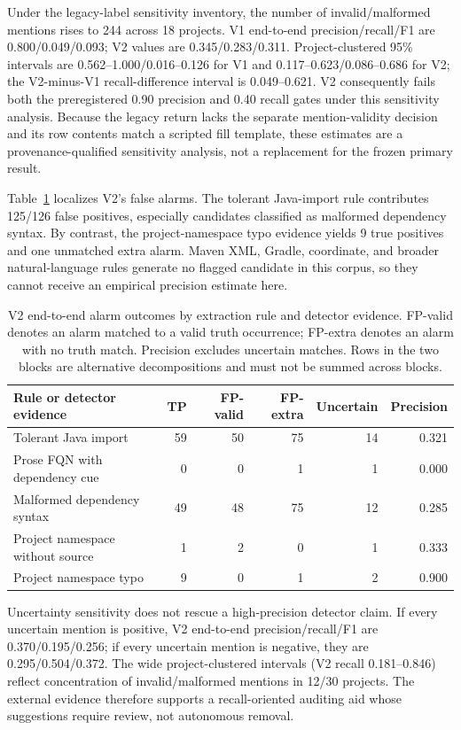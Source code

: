 \documentclass[pdflatex,sn-basic]{sn-jnl}
\begin{document}
Under the legacy-label sensitivity inventory, the number of invalid/malformed mentions rises to 244 across 18 projects. V1 end-to-end precision/recall/F1 are 0.800/0.049/0.093; V2 values are 0.345/0.283/0.311. Project-clustered 95\% intervals are 0.562--1.000/0.016--0.126 for V1 and 0.117--0.623/0.086--0.686 for V2; the V2-minus-V1 recall-difference interval is 0.049--0.621. V2 consequently fails both the preregistered 0.90 precision and 0.40 recall gates under this sensitivity analysis. Because the legacy return lacks the separate mention-validity decision and its row contents match a scripted fill template, these estimates are a provenance-qualified sensitivity analysis, not a replacement for the frozen primary result.

Table~\ref{tab:external-v2-errors} localizes V2's false alarms. The tolerant Java-import rule contributes 125/126 false positives, especially candidates classified as malformed dependency syntax. By contrast, the project-namespace typo evidence yields 9 true positives and one unmatched extra alarm. Maven XML, Gradle, coordinate, and broader natural-language rules generate no flagged candidate in this corpus, so they cannot receive an empirical precision estimate here.

\begin{table}[htbp]
\caption{V2 end-to-end alarm outcomes by extraction rule and detector evidence. FP-valid denotes an alarm matched to a valid truth occurrence; FP-extra denotes an alarm with no truth match. Precision excludes uncertain matches. Rows in the two blocks are alternative decompositions and must not be summed across blocks.}
\label{tab:external-v2-errors}
{\footnotesize
\setlength{\tabcolsep}{3pt}
\begin{tabular}{@{}lrrrrr@{}}
\toprule
Rule or detector evidence & TP & FP-valid & FP-extra & Uncertain & Precision \\
\midrule
Tolerant Java import & 59 & 50 & 75 & 14 & 0.321 \\
Prose FQN with dependency cue & 0 & 0 & 1 & 1 & 0.000 \\
\midrule
Malformed dependency syntax & 49 & 48 & 75 & 12 & 0.285 \\
Project namespace without source & 1 & 2 & 0 & 1 & 0.333 \\
Project namespace typo & 9 & 0 & 1 & 2 & 0.900 \\
\bottomrule
\end{tabular}
}
\end{table}

Uncertainty sensitivity does not rescue a high-precision detector claim. If every uncertain mention is positive, V2 end-to-end precision/recall/F1 are 0.370/0.195/0.256; if every uncertain mention is negative, they are 0.295/0.504/0.372. The wide project-clustered intervals (V2 recall 0.181--0.846) reflect concentration of invalid/malformed mentions in 12/30 projects. The external evidence therefore supports a recall-oriented auditing aid whose suggestions require review, not autonomous removal.
\end{document}
